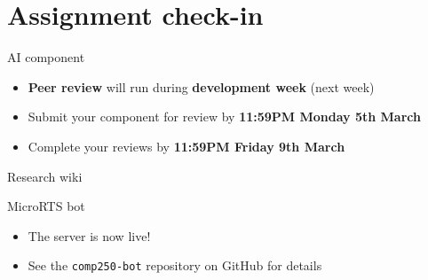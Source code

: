 \part{Assignment check-in}
\frame{\partpage}

\begin{frame}{AI component}
	\begin{itemize}
		\pause\item \textbf{Peer review} will run during \textbf{development week} (next week)
		\pause\item Submit your component for review by \textbf{11:59PM Monday 5th March}
		\pause\item Complete your reviews by \textbf{11:59PM Friday 9th March}
	\end{itemize}
\end{frame}

\begin{frame}{Research wiki}
\end{frame}

\begin{frame}{MicroRTS bot}
	\begin{itemize}
		\pause\item The server is now live!
		\pause\item See the \texttt{comp250-bot} repository on GitHub for details
	\end{itemize}
\end{frame}

